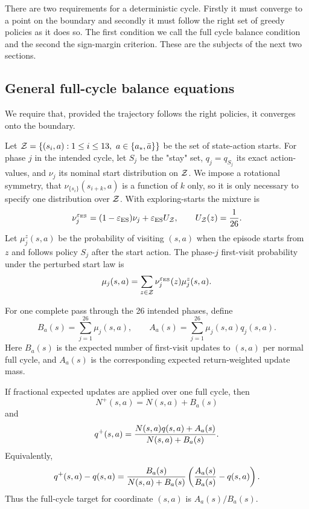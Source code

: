 There are two requirements for a deterministic cycle. Firstly it must
converge to a point on the boundary and secondly it must follow the
right set of greedy policies as it does so. The first condition we
call the full cycle balance condition and the second the sign-margin
criterion. These are the subjects of the next two sections.

\subsection{General full-cycle balance equations}
\label{sec:balance-general}
We require that, provided the trajectory follows the right policies,
it converges onto the boundary.

Let $\calZ=\{(s_i,a):1\le i\le13,\ a\in\{\astar,\abar\}\}$ be the set
of state-action starts.  For phase $j$ in the intended cycle, let
$S_j$ be the "stay" set, $q_j=q_{S_j}$ its exact action-values, and
$\nu_j$ its nominal start distribution on $\mathcal Z$. We impose a
rotational symmetry, that 
$\nu_{\{s_{i}\}}(s_{i+k},a)$ is a function of $k$ only, so it is only
necessary to specify one distribution over $\mathcal Z$.
With
exploring-starts the  mixture is
\begin{equation*}
    \nu_j^{\varepsilon_{\rm ES}}=(1-\varepsilon_{\rm ES})\nu_j+\varepsilon_{\rm ES} U_{\mathcal Z},
    \qquad
    U_{\mathcal Z}(z)={1\over 26}.
\end{equation*}
Let $\mu_j^z(s,a)$ be the probability of visiting $(s,a)$ when the episode starts from $z$ and follows policy $S_j$ after the start action.  The phase-$j$ first-visit probability under the perturbed start law is
\begin{equation*}
    \mu_j(s,a)=\sum_{z\in\mathcal Z}\nu_j^{\varepsilon_{\rm ES}}(z)\mu_j^z(s,a).
\end{equation*}

For one complete pass through the 26 intended phases, define
\begin{equation*}
    B_a(s)=\sum_{j=1}^{26}\mu_j(s,a),
    \qquad
    A_a(s)=\sum_{j=1}^{26}\mu_j(s,a)q_j(s,a).
\end{equation*}
Here $B_a(s)$ is the expected number of first-visit updates to $(s,a)$ per normal full cycle, and $A_a(s)$ is the corresponding expected return-weighted update mass.

If fractional expected updates are applied over one full cycle, then
\begin{equation*}
    N^+(s,a)=N(s,a)+B_a(s)
\end{equation*}
and
\begin{equation*}
    q^+(s,a)=
    {N(s,a)q(s,a)+A_a(s)\over N(s,a)+B_a(s)}.
\end{equation*}
Equivalently,
\begin{equation*}
    q^+(s,a)-q(s,a)
    ={B_a(s)\over N(s,a)+B_a(s)}
    \left({A_a(s)\over B_a(s)}-q(s,a)\right).
\end{equation*}
Thus the full-cycle target for coordinate $(s,a)$ is $A_a(s)/B_a(s)$.

